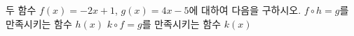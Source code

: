 두 함수 $f(x)=-2x+1$, $g(x)=4x-5$에 대하여 다음을 구하시오.
 $f\circ h=g$를 만족시키는 함수 $h(x)$
 $k\circ f=g$를 만족시키는 함수 $k(x)$

